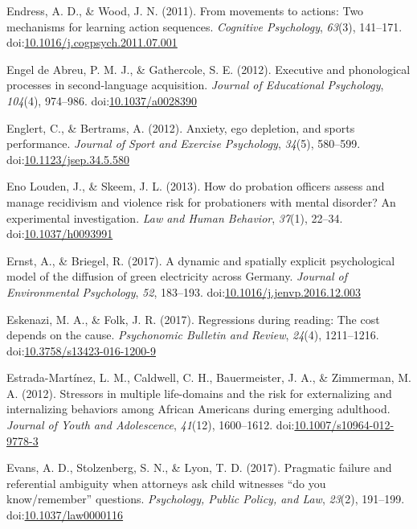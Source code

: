 \documentclass[english,man]{apa6}
\theoremstyle{definition}
\theoremstyle{definition}
\theoremstyle{definition}
\theoremstyle{remark}
\begin{document}
\hypertarget{ref-Endress2011}{}
Endress, A. D., \& Wood, J. N. (2011). From movements to actions: Two
mechanisms for learning action sequences. \emph{Cognitive Psychology},
\emph{63}(3), 141--171.
doi:\href{https://doi.org/10.1016/j.cogpsych.2011.07.001}{10.1016/j.cogpsych.2011.07.001}

\hypertarget{ref-EngeldeAbreu2012}{}
Engel de Abreu, P. M. J., \& Gathercole, S. E. (2012). Executive and
phonological processes in second-language acquisition. \emph{Journal of
Educational Psychology}, \emph{104}(4), 974--986.
doi:\href{https://doi.org/10.1037/a0028390}{10.1037/a0028390}

\hypertarget{ref-Englert2012}{}
Englert, C., \& Bertrams, A. (2012). Anxiety, ego depletion, and sports
performance. \emph{Journal of Sport and Exercise Psychology},
\emph{34}(5), 580--599.
doi:\href{https://doi.org/10.1123/jsep.34.5.580}{10.1123/jsep.34.5.580}

\hypertarget{ref-EnoLouden2013}{}
Eno Louden, J., \& Skeem, J. L. (2013). How do probation officers assess
and manage recidivism and violence risk for probationers with mental
disorder? An experimental investigation. \emph{Law and Human Behavior},
\emph{37}(1), 22--34.
doi:\href{https://doi.org/10.1037/h0093991}{10.1037/h0093991}

\hypertarget{ref-Ernst2017}{}
Ernst, A., \& Briegel, R. (2017). A dynamic and spatially explicit
psychological model of the diffusion of green electricity across
Germany. \emph{Journal of Environmental Psychology}, \emph{52},
183--193.
doi:\href{https://doi.org/10.1016/j.jenvp.2016.12.003}{10.1016/j.jenvp.2016.12.003}

\hypertarget{ref-Eskenazi2016}{}
Eskenazi, M. A., \& Folk, J. R. (2017). Regressions during reading: The
cost depends on the cause. \emph{Psychonomic Bulletin and Review},
\emph{24}(4), 1211--1216.
doi:\href{https://doi.org/10.3758/s13423-016-1200-9}{10.3758/s13423-016-1200-9}

\hypertarget{ref-Estrada-Martinez2012}{}
Estrada-Martínez, L. M., Caldwell, C. H., Bauermeister, J. A., \&
Zimmerman, M. A. (2012). Stressors in multiple life-domains and the risk
for externalizing and internalizing behaviors among African Americans
during emerging adulthood. \emph{Journal of Youth and Adolescence},
\emph{41}(12), 1600--1612.
doi:\href{https://doi.org/10.1007/s10964-012-9778-3}{10.1007/s10964-012-9778-3}

\hypertarget{ref-Evans2017b}{}
Evans, A. D., Stolzenberg, S. N., \& Lyon, T. D. (2017). Pragmatic
failure and referential ambiguity when attorneys ask child witnesses
``do you know/remember'' questions. \emph{Psychology, Public Policy, and
Law}, \emph{23}(2), 191--199.
doi:\href{https://doi.org/10.1037/law0000116}{10.1037/law0000116}
\end{document}
